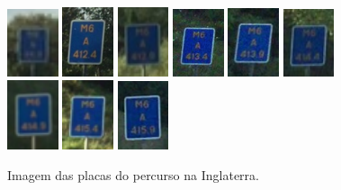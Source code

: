 \documentclass{article}
\begin{document}
\begin{figure}[!h]
    \centering
    \includegraphics[width=1.5cm]{./img/IPlaca1.png}\quad
    \includegraphics[width=1.5cm]{./img/IPlaca2.png}\quad
    \includegraphics[width=1.5cm]{./img/IPlaca3.png}\quad
    \includegraphics[width=1.5cm]{./img/IPlaca4.png}\quad
    \includegraphics[width=1.5cm]{./img/IPlaca5.png}\quad
    \includegraphics[width=1.5cm]{./img/IPlaca6.png}\quad
    \includegraphics[width=1.5cm]{./img/IPlaca7.png}\quad
    \includegraphics[width=1.5cm]{./img/IPlaca8.png}\quad
    \includegraphics[width=1.5cm]{./img/IPlaca9.png}
    \caption{Imagem das placas do percurso na Inglaterra.}
\end{figure}
\end{document}
